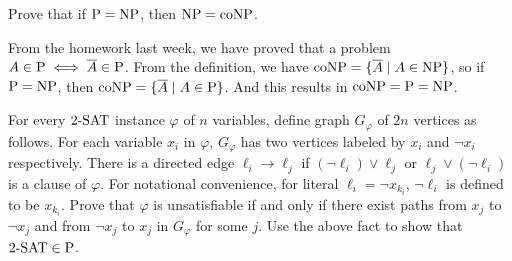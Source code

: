 \documentclass{homework}
\begin{document}
\begin{problem}
  Prove that if $\P = \NP$, then $\NP = \coNP$.
\end{problem}

\begin{solution}

  From the homework last week, we have proved that a problem $A \in \P \iff \overline{A} \in \P$.
  From the definition, we have $\coNP = \{\overline{A} \mid A \in \NP\}$,
  so if $\P = \NP$, then $\coNP = \{\overline{A} \mid A \in \P\}$.
  And this results in $\coNP = \P = \NP$.

\end{solution}

\begin{problem}
  For every $\TWOSAT$ instance $\varphi$ of $n$ variables, define graph
  $G_{\varphi}$ of $2n$ vertices as follows.
  For each variable $x_{i}$ in $\varphi$, $G_{\varphi}$ has two vertices labeled
  by $x_{i}$ and $\neg x_{i}$ respectively.
  There is a directed edge $\ell_{i} \to \ell_{j}$ if
  $(\neg \ell_{i}) \lor \ell_{j}$ or $\ell_{j} \lor (\neg \ell_{i})$ is a clause
  of $\varphi$.
  For notational convenience, for literal $\ell_{i} = \neg x_{k_{i}}$,
  $\neg \ell_{i}$ is defined to be $x_{k_{i}}$.
  Prove that $\varphi$ is unsatisfiable if and only if there exist
  paths from $x_{j}$ to $\neg x_{j}$ and from $\neg x_{j}$ to $x_{j}$ in
  $G_{\varphi}$ for some $j$.
  Use the above fact to show that $\TWOSAT \in \P$.
\end{problem}
\end{document}
